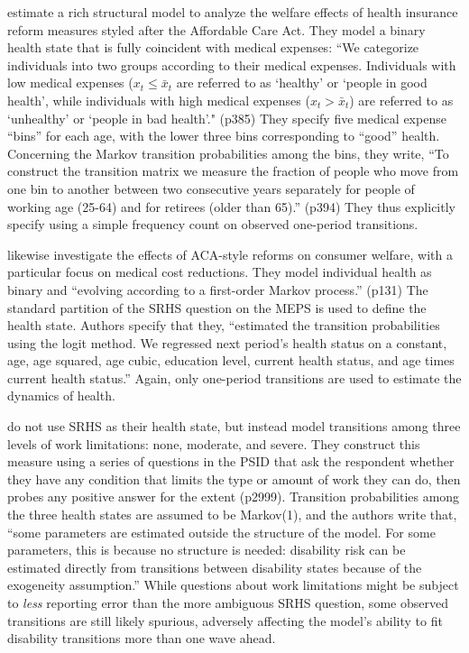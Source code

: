 \documentclass[12pt,pdftex,letterpaper]{article}
\begin{document}
\cite{Pashchenko13} estimate a rich structural model to analyze the welfare effects of health insurance reform measures styled after the Affordable Care Act.  They model a binary health state that is fully coincident with medical expenses: ``We categorize individuals into two groups according to their medical expenses.  Individuals with low medical expenses ($x_t \leq \bar{x}_t$ are referred to as `healthy' or `people in good health', while individuals with high medical expenses ($x_t > \bar{x}_t$) are referred to as `unhealthy' or `people in bad health'." (p385)  They specify five medical expense ``bins'' for each age, with the lower three bins corresponding to ``good'' health.  Concerning the Markov transition probabilities among the bins, they write, ``To construct the transition matrix we measure the fraction of people who move from one bin to another between two consecutive years separately for people of working age (25-64) and for retirees (older than 65).'' (p394) They thus explicitly specify using a simple frequency count on observed one-period transitions.

\cite{Ferreira17} likewise investigate the effects of ACA-style reforms on consumer welfare, with a particular focus on medical cost reductions.  They model individual health as binary and ``evolving according to a first-order Markov process.'' (p131)  The standard partition of the SRHS question on the MEPS is used to define the health state.  Authors specify that they, ``estimated the transition probabilities using the logit method.  We regressed next period's health status on a constant, age, age squared, age cubic, education level, current health status, and age times current health status.''  Again, only one-period transitions are used to estimate the dynamics of health.

\cite{LowPistaferri15} do not use SRHS as their health state, but instead model transitions among three levels of work limitations: none, moderate, and severe.  They construct this measure using a series of questions in the PSID that ask the respondent whether they have any condition that limits the type or amount of work they can do, then probes any positive answer for the extent (p2999).  Transition probabilities among the three health states are assumed to be Markov(1), and the authors write that, ``some parameters are estimated outside the structure of the model.  For some parameters, this is because no structure is needed: disability risk can be estimated directly from transitions between disability states because of the exogeneity assumption.''  While questions about work limitations might be subject to \textit{less} reporting error than the more ambiguous SRHS question, some observed transitions are still likely spurious, adversely affecting the model's ability to fit disability transitions more than one wave ahead.
\end{document}
